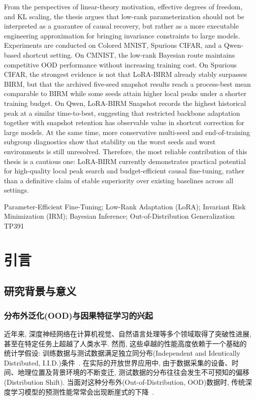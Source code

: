 \documentclass[a4paper,punct=banjiao,twoside]{ctexrep}
\theoremstyle{plain}
\theoremstyle{definition}
\theoremstyle{remark}
\begin{document}
From the perspectives of linear-theory motivation, effective degrees of freedom, and KL scaling, the thesis argues that low-rank parameterization should not be interpreted as a guarantee of causal recovery, but rather as a more executable engineering approximation for bringing invariance constraints to large models. Experiments are conducted on Colored MNIST, Spurious CIFAR, and a Qwen-based shortcut setting. On CMNIST, the low-rank Bayesian route maintains competitive OOD performance without increasing training cost. On Spurious CIFAR, the strongest evidence is not that LoRA-BIRM already stably surpasses BIRM, but that the archived five-seed snapshot results reach a process-best mean comparable to BIRM while some seeds attain higher local peaks under a shorter training budget. On Qwen, LoRA-BIRM Snapshot records the highest historical peak at a similar time-to-best, suggesting that restricted backbone adaptation together with snapshot retention has observable value in shortcut correction for large models. At the same time, more conservative multi-seed and end-of-training subgroup diagnostics show that stability on the worst seeds and worst environments is still unresolved. Therefore, the most reliable contribution of this thesis is a cautious one: LoRA-BIRM currently demonstrates practical potential for high-quality local peak search and budget-efficient causal fine-tuning, rather than a definitive claim of stable superiority over existing baselines across all settings.

\vspace{1em}
 Parameter-Efficient Fine-Tuning; Low-Rank Adaptation (LoRA); Invariant Risk Minimization (IRM); Bayesian Inference; Out-of-Distribution Generalization\\
 TP391

\clearpage
\mbox{}
\thispagestyle{empty}

\renewcommand{\thepage}{\arabic{page}}
\setcounter{page}{1}


\chapter{引言}

\section{研究背景与意义}
\subsection{分布外泛化(OOD)与因果特征学习的兴起}
近年来, 深度神经网络在计算机视觉、自然语言处理等多个领域取得了突破性进展, 甚至在特定任务上超越了人类水平. 然而, 这些卓越的性能高度依赖于一个基础的统计学假设: 训练数据与测试数据满足独立同分布(Independent and Identically Distributed, I.I.D.)条件~\cite{shen2021towards}. 在实际的开放世界应用中, 由于数据采集的设备、时间、地理位置及背景环境的不断变迁, 测试数据的分布往往会发生不可预知的偏移(Distribution Shift). 当面对这种分布外(Out-of-Distribution, OOD)数据时, 传统深度学习模型的预测性能常常会出现断崖式的下降~\cite{hendrycks2019benchmarking}.
\end{document}
